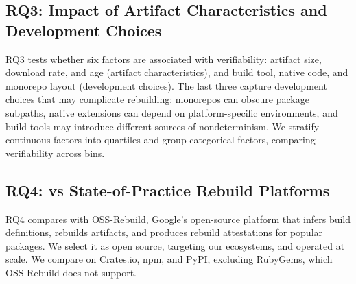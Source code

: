 \subsection{RQ3: Impact of Artifact Characteristics and Development Choices}

RQ3 tests whether six factors are associated with verifiability: artifact size, download rate, and age (artifact characteristics), and build tool, native code,
and monorepo layout (development choices). The last three capture development choices that may complicate rebuilding: monorepos can obscure package subpaths, native extensions can depend on platform-specific environments, and build tools may introduce different sources of nondeterminism.
We stratify continuous factors into quartiles and group categorical factors, comparing verifiability across bins.





\subsection{RQ4: \toolname vs State-of-Practice Rebuild Platforms}
\label{subsec:method-rq5}

RQ4 compares \toolname with OSS-Rebuild, Google's open-source platform that infers build definitions, rebuilds artifacts, and produces rebuild attestations for popular packages. We select it as open source, targeting our ecosystems, and operated at scale. We compare on Crates.io, npm, and PyPI, excluding RubyGems, which OSS-Rebuild does not support.

